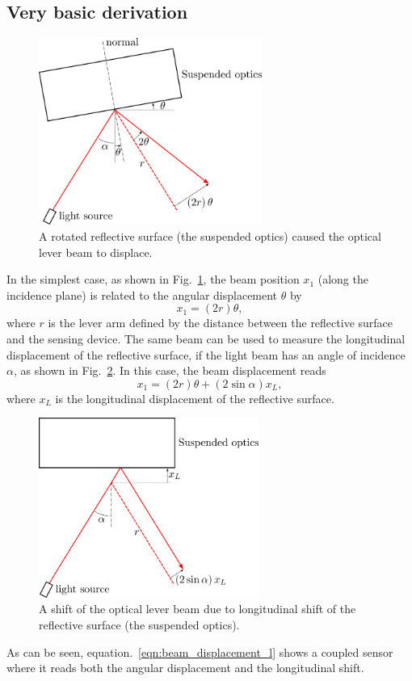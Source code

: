\subsection{Very basic derivation \label{sec:very_basic_derivation}}
\begin{figure}[!h]
	\centering
	\includegraphics[width=73mm]{figures/optical_lever_rotation}
	\caption{A rotated reflective surface (the suspended optics) caused the optical lever beam to displace.}
	\label{fig:opticalleverrotation}
\end{figure}
In the simplest case, as shown in Fig.~\ref{fig:opticalleverrotation}, the beam position $x_1$ (along the incidence plane) is related to the angular displacement $\theta$ by
\begin{equation}
	x_1=\left(2r\right)\theta,
	\label{eqn:x1}
\end{equation}
where $r$ is the lever arm defined by the distance between the reflective surface and the sensing device.
The same beam can be used to measure the longitudinal displacement of the reflective surface, if the light beam has an angle of incidence $\alpha$, as shown in Fig.~\ref{fig:opticallevershifted}.
In this case, the beam displacement reads
\begin{equation}
	x_1=\left(2r\right)\theta + \left(2\sin{\alpha}\right)x_L,
	\label{eqn:beam_displacement_l}
\end{equation}
where $x_L$ is the longitudinal displacement of the reflective surface.
\begin{figure}[!h]
	\centering
	\includegraphics[width=72mm]{figures/optical_lever_shifted}
	\caption{A shift of the optical lever beam due to longitudinal shift of the reflective surface (the suspended optics).}
	\label{fig:opticallevershifted}
\end{figure}
As can be seen, equation.~\eqref{eqn:beam_displacement_l} shows a coupled sensor where it reads both the angular displacement and the longitudinal shift.

